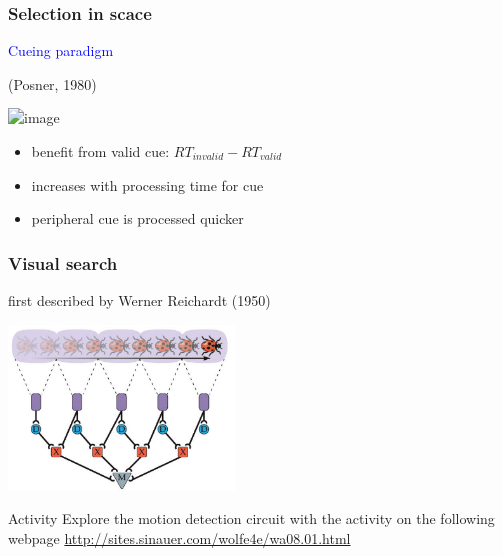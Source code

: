 \documentclass[]{beamer}
\begin{document}
\begin{frame}
\frametitle{Selection in scace}
\begin{overlayarea}{110mm}{75mm}
\begin{center}
\textcolor{blue}{Cueing paradigm} \begin{scriptsize}(Posner, 1980) \end{scriptsize}
\end{center}

 \begin{center}
\includegraphics<1-2>[width=70mm]{figs/l8/cueing_results.png}
 \end{center}
\begin{itemize}
 \item benefit from valid cue: $RT_{invalid} - RT_{valid}$
 \item increases with processing time for cue 
 \item peripheral cue is processed quicker
\end{itemize}
\end{overlayarea}
\end{frame}


\begin{frame}
 \frametitle{Visual search}
\begin{overlayarea}{130mm}{80mm}
first described by Werner Reichardt (1950)
 \begin{center}
\includegraphics[width=60mm]{figs/l7/reichardt_detector_manycells.png}
 \end{center}
\end{overlayarea}
\end{frame}



\begin{frame}

\begin{block}{Activity}
Explore the motion detection circuit with the activity on the following webpage \url{http://sites.sinauer.com/wolfe4e/wa08.01.html}
\end{block}
\end{frame}
\end{document}
